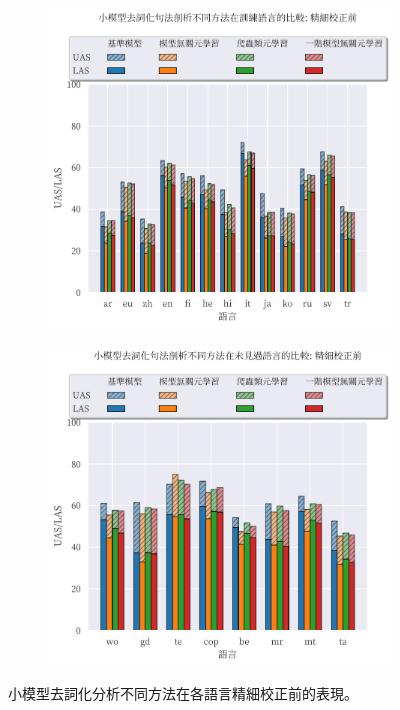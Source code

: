 \begin{figure}[!htbp]
    \centering
    \begin{subfigure}[t]{0.75\textwidth}
        \centering
        \includegraphics[width=\textwidth]{figs/chapter3/delex/bar_small_zs_train_langs.pdf}
    \end{subfigure}
    \vspace{-12pt}
    \begin{subfigure}[t]{0.75\textwidth}
        \centering
        \includegraphics[width=\textwidth]{figs/chapter3/delex/bar_small_zs_test_langs.pdf}
    \end{subfigure}
    \caption{小模型去詞化分析不同方法在各語言精細校正前的表現。}
    \label{fig:bar_small_zs}
\end{figure}